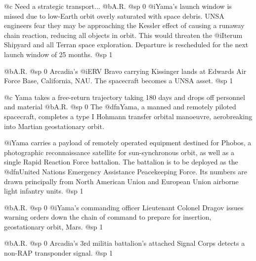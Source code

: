 @c Need a strategic transport...
@b{A.R.}
@sp 0
@i{Yama's} launch window is missed due to low-Earth orbit overly saturated with space debris. UNSA engineers fear they may be approaching the Kessler effect of causing a runaway chain reaction, reducing all objects in orbit. This would threaten the @i{Iterum Shipyard} and all Terran space exploration. Departure is rescheduled for the next launch window of 25 months.
@sp 1

@b{A.R.}
@sp 0
Arcadia's @i{ERV Bravo} carrying Kissinger lands at Edwards Air Force Base, California, NAU. The spacecraft becomes a UNSA asset.
@sp 1

@c Yama takes a free-return trajectory taking 180 days and drops off personnel and material
@b{A.R.}
@sp 0
The @dfn{Yama}, a manned and remotely piloted spacecraft, completes a type I Hohmann transfer orbital manoeuvre, aerobreaking into Martian geostationary orbit. 

@i{Yama} carries a payload of remotely operated equipment destined for Phobos, a photographic reconnaissance satellite for sun-synchronous orbit, as well as a single Rapid Reaction Force battalion. The battalion is to be deployed as the @dfn{United Nations Emergency Assistance Peacekeeping Force}. Its numbers are drawn principally from North American Union and European Union airborne light infantry units.
@sp 1

@b{A.R.}
@sp 0
@i{Yama's} commanding officer Lieutenant Colonel Dragov issues warning orders down the chain of command to prepare for insertion, geostationary orbit, Mars.
@sp 1

@b{A.R.}
@sp 0
Arcadia's 3rd militia battalion's attached Signal Corps detects a non-RAP transponder signal.
@sp 1

